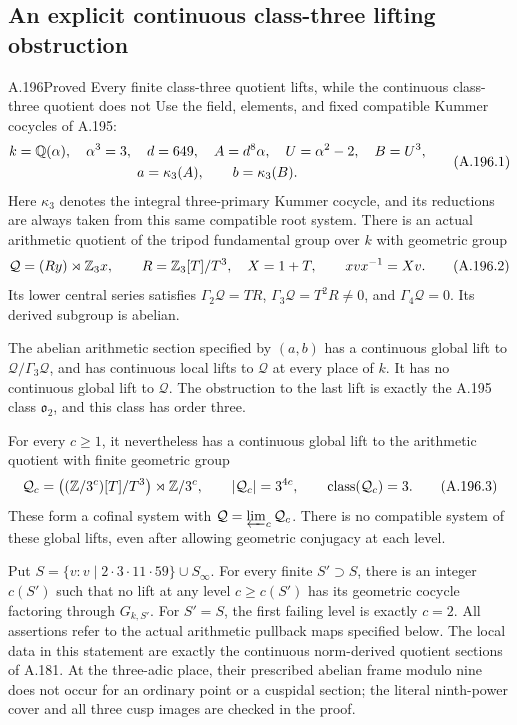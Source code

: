 \subsection{An explicit continuous class-three lifting obstruction}

\begin{statement}{A.196}{Proved}
{Every finite class-three quotient lifts, while the continuous class-three quotient does not}
Use the field, elements, and fixed compatible Kummer cocycles of
A.195:
\[
 \begin{gathered}
 k=\mathbb Q(\alpha),\quad\alpha^3=3,\quad d=649,\quad
 A=d^8\alpha,\quad U=\alpha^2-2,\quad B=U^3,\\
 a=\kappa_3(A),\qquad b=\kappa_3(B).
 \end{gathered}
\tag{A.196.1}
\]
Here \(\kappa_3\) denotes the integral three-primary Kummer
cocycle, and its reductions are always taken from this same
compatible root system.  There is an actual arithmetic quotient
of the tripod fundamental group over \(k\) with geometric group
\[
 \mathcal Q=(R y)\rtimes\mathbb Z_3x,
 \qquad R=\mathbb Z_3[T]/T^3,\quad X=1+T,
 \qquad xvx^{-1}=Xv.
\tag{A.196.2}
\]
Its lower central series satisfies
\(\Gamma_2\mathcal Q=TR\),
\(\Gamma_3\mathcal Q=T^2R\ne0\), and
\(\Gamma_4\mathcal Q=0\).  Its derived subgroup is abelian.

The abelian arithmetic section specified by \((a,b)\) has a
continuous global lift to \(\mathcal Q/\Gamma_3\mathcal Q\),
and has continuous local lifts to \(\mathcal Q\) at every place
of \(k\).  It has no continuous global lift to \(\mathcal Q\).
The obstruction to the last lift is exactly the A.195 class
\(\mathfrak o_2\), and this class has order three.

For every \(c\ge1\), it nevertheless has a continuous global
lift to the arithmetic quotient with finite geometric group
\[
 \mathcal Q_c=
 \bigl((\mathbb Z/3^c)[T]/T^3\bigr)\rtimes\mathbb Z/3^c,
 \qquad |\mathcal Q_c|=3^{4c},
 \qquad \operatorname{class}(\mathcal Q_c)=3.
\tag{A.196.3}
\]
These form a cofinal system with \(\mathcal Q=\varprojlim_c
\mathcal Q_c\).  There is no compatible system of these global
lifts, even after allowing geometric conjugacy at each level.

Put \(S=\{v:v\mid2\cdot3\cdot11\cdot59\}\cup S_\infty\).
For every finite \(S'\supset S\), there is an integer
\(c(S')\) such that no lift at any level \(c\ge c(S')\)
has its geometric cocycle factoring through \(G_{k,S'}\).
For \(S'=S\), the first failing level is exactly \(c=2\).
All assertions refer to the actual arithmetic pullback maps
specified below.  The local data in this statement are exactly
the continuous norm-derived quotient sections of A.181.  At the
three-adic place, their prescribed abelian frame modulo nine
does not occur for an ordinary point or a cuspidal section;
the literal ninth-power cover and all three cusp images are
checked in the proof.
\end{statement}


